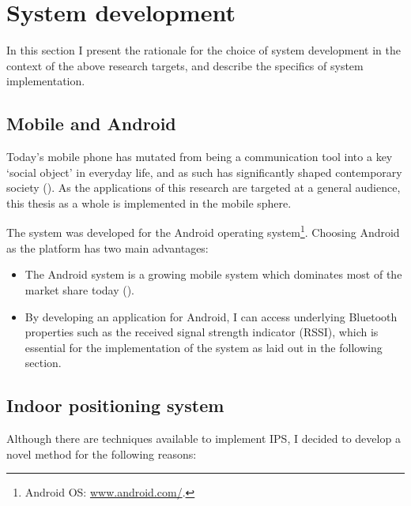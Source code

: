 \documentclass[a4paper,11pt]{article}
\begin{document}
\section{System development}

In this section I present the rationale for the choice of system development in the context of the above research targets, and describe the specifics of system implementation.

\subsection{Mobile and Android}

Today's mobile phone has mutated from being a communication tool into a key `social object' in everyday life, and as such has significantly shaped contemporary society (\cite{srivastava05}).
As the applications of this research are targeted at a general audience, this thesis as a whole is implemented in the mobile sphere.

The system was developed for the Android operating system\footnote{Android OS: \href{http://www.android.com/}{www.android.com/}.}.
Choosing Android as the platform has two main advantages:
\begin{itemize}
	\item The Android system is a growing mobile system which dominates most of the market share today (\cite{web:idc}).
	\item By developing an application for Android, I can access underlying Bluetooth properties such as the received signal strength indicator (RSSI), which is essential for the implementation of the system as laid out in the following section.
\end{itemize}

\subsection{Indoor positioning system}\label{methods:ips}

Although there are techniques available to implement IPS, I decided to develop a novel method for the following reasons:
\end{document}
